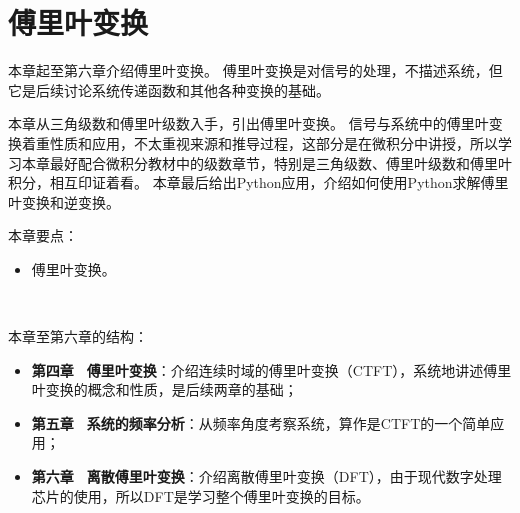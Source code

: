 \chapter{傅里叶变换}

本章起至第六章介绍傅里叶变换。
傅里叶变换是对信号的处理，不描述系统，但它是后续讨论系统传递函数和其他各种变换的基础。

本章从三角级数和傅里叶级数入手，引出傅里叶变换。
信号与系统中的傅里叶变换着重性质和应用，不太重视来源和推导过程，这部分是在微积分中讲授，所以学习本章最好配合微积分教材中的级数章节，特别是三角级数、傅里叶级数和傅里叶积分，相互印证着看。
本章最后给出Python应用，介绍如何使用Python求解傅里叶变换和逆变换。

本章要点：
\begin{itemize}
    \item 傅里叶变换。
\end{itemize}

~

本章至第六章的结构：
\begin{itemize}
    \item {\bf 第四章 \, 傅里叶变换}：介绍连续时域的傅里叶变换（CTFT），系统地讲述傅里叶变换的概念和性质，是后续两章的基础；
    \item {\bf 第五章 \, 系统的频率分析}：从频率角度考察系统，算作是CTFT的一个简单应用；
    \item {\bf 第六章 \, 离散傅里叶变换}：介绍离散傅里叶变换（DFT），由于现代数字处理芯片的使用，所以DFT是学习整个傅里叶变换的目标。
\end{itemize}

\newpage


\newpage


\newpage


\newpage





